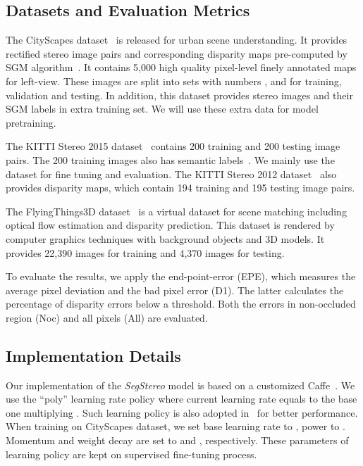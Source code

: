 \documentclass[runningheads]{llncs}
\begin{document}
\subsection{Datasets and Evaluation Metrics}

The CityScapes dataset~\cite{cordts2016cityscapes} is released for urban scene understanding. It provides rectified stereo image pairs and corresponding disparity maps pre-computed by SGM algorithm~\cite{hirschmuller2008stereo}. It contains 5,000 high quality pixel-level finely annotated maps for left-view. These images are split into sets with numbers ,  and  for training, validation and testing. In addition, this dataset provides  stereo images and their SGM labels in extra training set. We will use these extra data for model pretraining. 

The KITTI Stereo 2015 dataset~\cite{Menze2015CVPR} contains 200 training and 200 testing image pairs. The 200 training images also has semantic labels~\cite{Alhaija2017BMVC}. We mainly use the dataset for fine tuning and evaluation. The KITTI Stereo 2012 dataset~\cite{Geiger2012CVPR} also provides disparity maps, which contain 194 training and 195 testing image pairs. 

The FlyingThings3D dataset~\cite{mayer2016large} is a virtual dataset for scene matching including optical flow estimation and disparity prediction. This dataset is rendered by computer graphics techniques with background objects and 3D models. It provides 22,390 images for training and 4,370 images for testing. 

To evaluate the results, we apply the end-point-error (EPE), which measures the average pixel deviation and the bad pixel error (D1). The latter calculates the percentage of disparity errors below a threshold. Both the errors in non-occluded region (Noc) and all pixels (All) are evaluated.

\subsection{Implementation Details}

Our implementation of the \emph{SegStereo} model is based on a customized Caffe~\cite{jia2014caffe}. We use the ``poly'' learning rate policy where current learning rate equals to the base one multiplying . Such learning policy is also adopted in~\cite{brown2011discriminative,zhao2017pspnet} for better performance. When training on CityScapes dataset, we set base learning rate to , power to . Momentum and weight decay are set to  and , respectively. These parameters of learning policy are kept on supervised fine-tuning process. 
\end{document}
